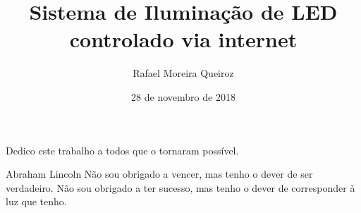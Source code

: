 \documentclass[bsc]{ufpethesis}
\institute{Centro de Tecnologia e Geociências}
\title{Sistema de Iluminação de LED controlado via internet}
\date{28 de novembro de 2018}
\author{Rafael Moreira Queiroz}
\begin{document}
\frontmatter

\frontpage

\presentationpage

\begin{dedicatory}
    Dedico este trabalho a todos que o tornaram possível.
\end{dedicatory}

\acknowledgements
    

\begin{epigraph}{Abraham Lincoln}
Não sou obrigado a vencer, mas tenho o dever de ser verdadeiro. Não sou obrigado a ter sucesso, mas tenho o dever de corresponder à luz que tenho.
\end{epigraph}

\resumo


\abstract


\tableofcontents

\listoffigures

\listoftables



\mainmatter







\backmatter
\end{document}
